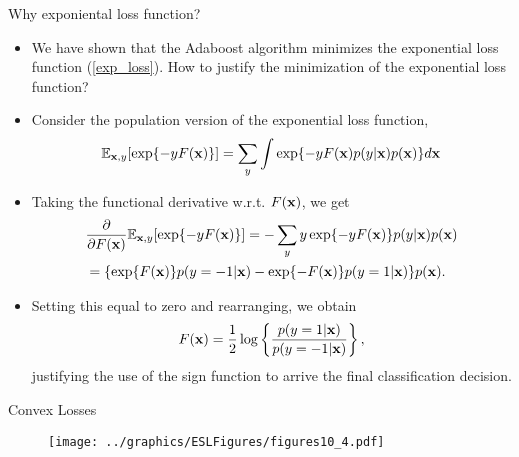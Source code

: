 \documentclass{beamer}
\def\bfx{{\bf x}}
\begin{document}
                     \begin{frame}{Why exponiental loss function?}
                     \begin{itemize}\small
                      \item We have shown that the Adaboost algorithm minimizes the exponential loss function (\ref{exp_loss}). How to justify the minimization of the exponential loss function?
                      \item Consider the population version of the exponential loss function, 
                      $$\mathbb{E}_{\bfx,y}[\exp \{-y F(\bfx)\}]=\sum_y \int \exp\{-y F(\bfx)p(y|\bfx)p(\bfx)\}d\bfx$$
                      \item Taking the functional derivative w.r.t. $F(\bfx)$, we get
                      \begin{align*}
                      &\frac{\partial}{\partial F(\bfx)}\mathbb{E}_{\bfx,y}[\exp\{-y F(\bfx)\} ]=-\sum_y y\exp\{-y F(\bfx)\}p(y|\bfx)p(\bfx)\\
                      &=\{\exp\{F(\bfx)\}p(y=-1|\bfx)-\exp\{-F(\bfx)\}p(y=1|\bfx) \}p(\bfx).
                      \end{align*}
                      \item Setting this equal to zero and rearranging, we obtain
                      $$F(\bfx)= \frac{1}{2}\log \left\{\frac{p(y=1|\bfx)}{p(y=-1|\bfx)}\right\},$$
                      justifying the use of the sign function to arrive the final classification decision.
                      \end{itemize}
                     \end{frame}

                     \begin{frame}{Convex Losses}

                      \begin{figure}
                        \centering
                        
                        \centering
                        \texttt{[image: ../graphics/ESLFigures/figures10\_4.pdf]}
                      \end{figure}

                     \end{frame}
\end{document}
